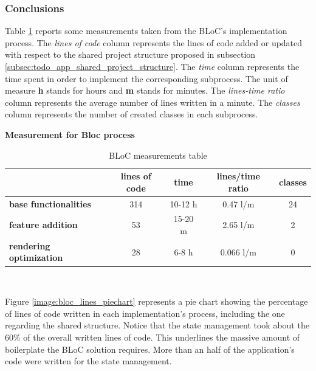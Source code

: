 \subsubsection{Conclusions} 
\label{subpar:render_optimizations_bloc}
Table \ref{table:recap_bloc} reports some measurements taken from the BLoC's implementation process. The \textit{lines of code} column represents the lines of code added or updated with respect to the shared project structure proposed in subsection \ref{subsec:todo_app_shared_project_structure}. The \textit{time }column represents the time spent in order to implement the corresponding subprocess. The unit of measure \textbf{h} stands for hours and \textbf{m} stands for minutes. The \textit{lines-time ratio} column represents the average number of lines written in a minute. The \textit{classes} column represents the number of created classes in each subprocess.

\begin{table}[H]
    \caption*{\textbf{Measurement for Bloc process}}
    \centering 
    \begin{tabular}{| l | c | c | c | c |}
    \hline
    \rowcolor{bluepoli!40} %
    \hline
     & \textbf{lines of code} & \textbf{time} & \textbf{lines/time ratio} & \textbf{classes} \T\B \\
    \hline
    \textbf{base functionalities} & 314 & 10-12 h & 0.47 l/m & 24 \T\B \\ 
    \textbf{feature addition} & 53 & 15-20 m & 2.65 l/m & 2 \T\B\\ 
    \textbf{rendering optimization} & 28 & 6-8 h & 0.066 l/m & 0
    \T\B\\
    \hline
    \end{tabular}
    \\[10pt]
    \caption{BLoC measurements table}
    \label{table:recap_bloc}
\end{table}

Figure \ref{image:bloc_lines_piechart} represents a pie chart showing the percentage of lines of code written in each implementation's process, including the one regarding the shared structure. Notice that the state management took about the 60\% of the overall written lines of code. This underlines the massive amount of boilerplate the BLoC solution requires. More than an half of the application's code were written for the state management.

